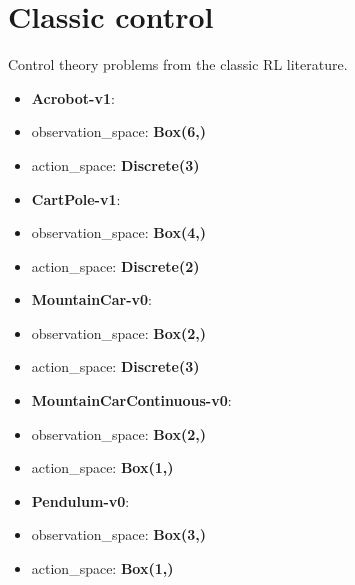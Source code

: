 \documentclass[11pt]{article}
\providecommand{\tightlist}{%
      \setlength{\itemsep}{0pt}\setlength{\parskip}{0pt}}
\begin{document}
    \section{Classic control}\label{classic-control}

Control theory problems from the classic RL literature.

\begin{itemize}
\tightlist
\item
  \textbf{Acrobot-v1}:
\item
  observation\_space: \textbf{Box(6,)}
\item
  action\_space: \textbf{Discrete(3)}
\item
  \textbf{CartPole-v1}:
\item
  observation\_space: \textbf{Box(4,)}
\item
  action\_space: \textbf{Discrete(2)}
\item
  \textbf{MountainCar-v0}:
\item
  observation\_space: \textbf{Box(2,)}
\item
  action\_space: \textbf{Discrete(3)}
\item
  \textbf{MountainCarContinuous-v0}:
\item
  observation\_space: \textbf{Box(2,)}
\item
  action\_space: \textbf{Box(1,)}
\item
  \textbf{Pendulum-v0}:
\item
  observation\_space: \textbf{Box(3,)}
\item
  action\_space: \textbf{Box(1,)}
\end{itemize}
\end{document}
